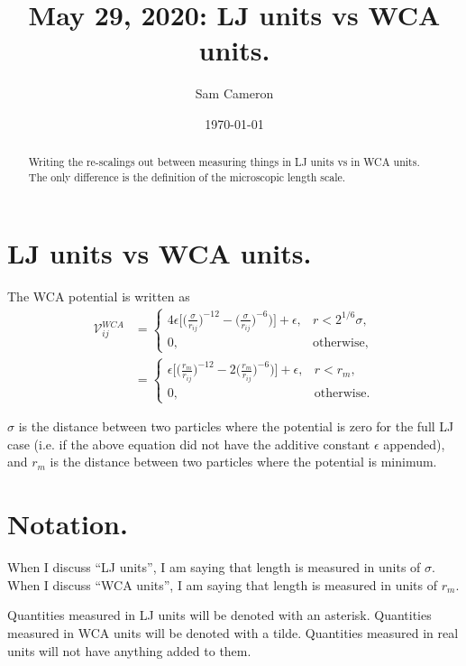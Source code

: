 \documentclass[twocolumn,amsmath,amssymb,aps]{revtex4-1}%
\begin{document}
 
\title{May 29, 2020: LJ units vs WCA units.}
\author{Sam Cameron}
%
\date{\today}

\begin{abstract}
  Writing the re-scalings out between measuring things in LJ units
  vs in WCA units. The only difference is the definition of the
  microscopic length scale.
\end{abstract}


\maketitle

\section{LJ units vs WCA units.}

The WCA potential is written as
\begin{align*}\label{eq:WCAapprox}
  \mathcal{V}^{WCA}_{ij}
  &=
  \begin{cases}
    4\epsilon\bigg[\bigg(\frac{\sigma}{r_{ij}}\bigg)^{-12}
      -\bigg(\frac{\sigma}{r_{ij}}\bigg)^{-6})\bigg]+\epsilon,
    & r<2^{1/6}\sigma, \\
    0, & \mathrm{otherwise},
  \end{cases}\nonumber\\
  &=
  \begin{cases}
    \epsilon\bigg[\bigg(\frac{r_m}{r_{ij}}\bigg)^{-12}
      -2\bigg(\frac{r_m}{r_{ij}}\bigg)^{-6})\bigg]+\epsilon,
    & r<r_m, \\
    0, & \mathrm{otherwise}.
  \end{cases}
\end{align*}

$\sigma$ is the distance between two particles where the potential
is zero for the full LJ case (i.e. if the above equation did not have
the additive constant $\epsilon$ appended), and $r_m$ is the distance between
two particles where the potential is minimum.

\section{Notation.}
When I discuss ``LJ units'', I am saying that length is measured in units
of $\sigma$. When I discuss ``WCA units'', I am saying that length is
measured in units of $r_m$.

Quantities measured in LJ units will be denoted with an asterisk.
Quantities measured in WCA units will be denoted with a tilde.
Quantities measured in real units will not have anything added to them.
\end{document}

